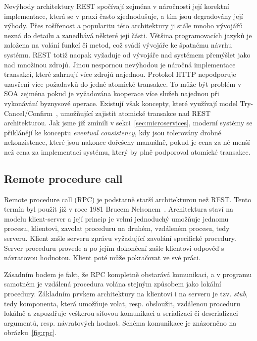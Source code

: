 Nevýhody architektury \gls{REST} spočívají zejména v náročnosti její korektní implementace,
která se v praxi často zjednodušuje, a tím jsou degradovány její výhody. Přes rošířenost a popularitu
této architektury ji stále mnoho vývojářů nezná do detailu a zanedbává některé její části.
Většina programovacích jazyků je založena na volání funkcí či metod, což svádí vývojáře ke
špatnému návrhu systému. \gls{REST} totiž naopak vyžaduje od vývojáře nad systémem přemýšlet jako
nad množinou zdrojů. Jinou nespornou nevýhodou je náročná implementace transakcí, které zahrnují více
zdrojů najednou. Protokol \gls{HTTP} nepodporuje uzavření více požadavků do jedné atomické
transakce. To může být problém v \gls{SOA} zejména pokud je vyžadována kooperace více služeb
najednou při vykonávání byznysové operace. Existují však koncepty, které využívají model
Try-Cancel/Confirm~\cite{pardon2011towards}, umožňující zajistit atomické transakce nad \gls{REST} architekturou.
Jak jsme již zmínili v sekci~\ref{sec:microservices}, moderní systémy se přiklánějí ke konceptu
\textit{eventual consistency}, kdy jsou tolerovány drobné nekonzistence, které jsou nakonec
dořešeny manuálně, pokud je cena za ně menší než cena za implementaci systému, který
by plně podporoval atomické transakce.

\subsection{Remote procedure call}\label{sec:rpc}

Remote procedure call (\gls{RPC}) je podstatně starší architekturou než \gls{REST}.
Tento termín byl použit již v roce 1981 Brucem Nelsonem~\cite{nelson1981remote}.
Architektura staví na modelu klient-server a její princip je velmi jednoduchý \textendash\xspace
umožňuje jednomu procesu, klientovi, zavolat proceduru na druhém, vzdáleném procesu, tedy serveru.
Klient zašle serveru zprávu vyžadující zavolání specifické procedury. Server
proceduru provede a po jejím dokončení zašle klientovi odpověď s návratovou hodnotou.
Klient poté může pokračovat ve své práci.

Zásadním bodem je fakt, že \gls{RPC} kompletně obstarává komunikaci, a v programu samotném
je vzdálená procedura volána stejným způsobem jako lokální procedury. Základním
prvkem architektury na klientovi i na serveru je tzv. \textit{stub}, tedy komponenta, která
umožňuje volat, resp. obsloužit, vzdálenou proceduru lokálně a zapozdřuje veškerou síťovou komunikaci
a serializaci či deserializaci argumentů, resp. návratových hodnot. Schéma komunikace
je znázorněno na obrázku~\ref{fig:rpc}.

